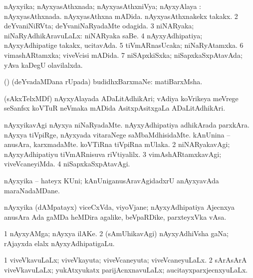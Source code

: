 \bentry
{}
\gl{\gu}
\bmng
\bnum
{} nAyxyika; nAyxyasAthxnada; nAyxyasAthxniVya; nAyxyAlaya : 
\banum
{} nAyxyasAthxnada. 
 nAyxyasAthxna mADida. 
 nAyxyasAthxnakekx takakx. 
\eanum
\numie
\num{2} deYvaniNiRVta; deYvaniNaRyadaMte odagida. 
\num{3} niNARyaka; niNaRyAdhikAravuLaLx:  niNARyaka saBe. 
\num{4} nAyxyAdhipatiya; nAyxyAdhipatige takakx, ucitavAda. 
\num{5} tiVmARnasUcaka; niNaRyAtamxka. 
\num{6} vimashARtamxka; viveVcisi mADida. 
\num{7} niSApxkiSxka; niSapxkaSxpAtavAda; yAva kaDegU olavilalxda. 
\enum
\emng
\eentry

\bentry
{}
\gl{\nA}
\bmng
(\deVva) (deYvadaMDana rUpada) budidhxBarxmaNe: matiBarxMsha. 
\emng
\eentry

\bentry
{}
\gl{\nA}
\bmng
(sAkxTelxMDf) nAyxyAlayada ADaLitAdhikAri; vAdiya koVrikeya meVrege seSanfsx koVTuR neVmaka mADida AsitxpAsitxgaLa ADaLitAdhikAri. 
\emng
\eentry

\bentry
{}
\gl{\kirxvi}
\bmng
\bnum
{} nAyxyikavAgi 
\banum
{} nAyxya niNaRyadaMte. 
 nAyxyAdhipatiya adhikArada parxkAra. 
 nAyxya tiVpiRge, nAyxyada vitaraNege saMbaMdhisidaMte. 
 kAnUnina -- anusAra, karxmadaMte. 
 koVTiRna tiVpiRna mUlaka. 
\eanum
\numie
\num{2} niNARyakavAgi; nAyxyAdhipatiyu tiVmARnisuva riVtiyalilx. 
\num{3} vimAshARtamxkavAgi; viveVcaneyiMda. 
\num{4} niSapxkaSxpAtavAgi. 
\enum
\emng
\eentry

\bentry
{}
\gl{\nA}
\bmng
nAyxyika -- hateyx KUni; kAnUniganusAravAgidadxrU anAyxyavAda maraNadaMDane. 
\emng
\eentry

\bentry
{}
\gl{\nA}
\bmng
nAyxyika (dAMpatayx) viceCxVda, viyoVjane; nAyxyAdhipatiya Ajecnxya anusAra Ada gaMDa heMDira agalike, beVpaRDike, parxteyxVka vAsa. 
\emng
\eentry

\bentry
{}
\gl{\nA}
\bmng
\bnum
\num{1} nAyxyAMga; nAyxya ilAKe. 
\num{2} (sAmUhikavAgi) nAyxyAdhiVsha gaNa; rAjayxda elalx nAyxyAdhipatigaLu. 
\enum
\emng
\eentry

\bentry
{}
\gl{\gu}
\bmng
\bnum
\num{1} viveVkavuLaLx; viveVkayuta; viveVcaneyuta; viveVcaneyuLaLx. 
\num{2} sArAsArA viveVkavuLaLx; yukAtxyukatx parijAcnxnavuLaLx; aucitayxparxjecnxyuLaLx. 
\enum
\emng
\eentry

